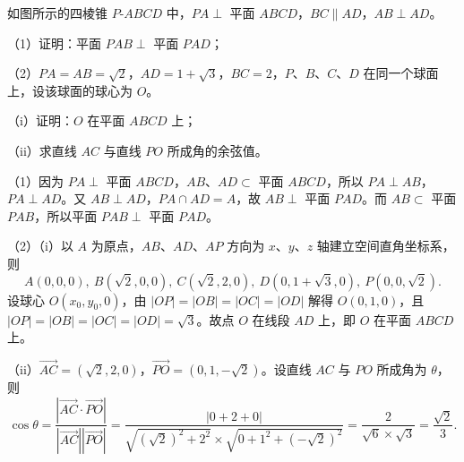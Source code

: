 \documentclass{exam-zh}
\begin{document}
\begin{problem}[points = 15]
如图所示的四棱锥 $P\text{-}ABCD$ 中，$PA\perp$ 平面 $ABCD$，$BC\parallel AD$，$AB\perp AD$。

\begin{center}
\end{center}

（1）证明：平面 $PAB\perp$ 平面 $PAD$；

（2）$PA=AB=\sqrt{2}$，$AD=1+\sqrt{3}$，$BC=2$，$P$、$B$、$C$、$D$ 在同一个球面上，设该球面的球心为 $O$。

\qquad（i）证明：$O$ 在平面 $ABCD$ 上；

\qquad（ii）求直线 $AC$ 与直线 $PO$ 所成角的余弦值。

\begin{solution}
（1）因为 $PA\perp$ 平面 $ABCD$，$AB$、$AD\subset$ 平面 $ABCD$，所以 $PA\perp AB$，$PA\perp AD$。又 $AB\perp AD$，$PA\cap AD=A$，故 $AB\perp$ 平面 $PAD$。而 $AB\subset$ 平面 $PAB$，所以平面 $PAB\perp$ 平面 $PAD$。

（2）（i）以 $A$ 为原点，$AB$、$AD$、$AP$ 方向为 $x$、$y$、$z$ 轴建立空间直角坐标系，则
\[A(0,0,0),\ B(\sqrt{2},0,0),\ C(\sqrt{2},2,0),\ D(0,1+\sqrt{3},0),\ P(0,0,\sqrt{2}).\]
设球心 $O(x_{0},y_{0},0)$，由 $|OP|=|OB|=|OC|=|OD|$ 解得 $O(0,1,0)$，且 $|OP|=|OB|=|OC|=|OD|=\sqrt{3}$。故点 $O$ 在线段 $AD$ 上，即 $O$ 在平面 $ABCD$ 上。

（ii）$\overrightarrow{AC}=(\sqrt{2},2,0)$，$\overrightarrow{PO}=(0,1,-\sqrt{2})$。设直线 $AC$ 与 $PO$ 所成角为 $\theta$，则
\[\cos\theta=\frac{\left|\overrightarrow{AC}\cdot\overrightarrow{PO}\right|}{\left|\overrightarrow{AC}\right|\left|\overrightarrow{PO}\right|}=\frac{|0+2+0|}{\sqrt{(\sqrt{2})^{2}+2^{2}}\times\sqrt{0+1^{2}+(-\sqrt{2})^{2}}}=\frac{2}{\sqrt{6}\times\sqrt{3}}=\frac{\sqrt{2}}{3}.\]
\end{solution}
\end{problem}
\end{document}
